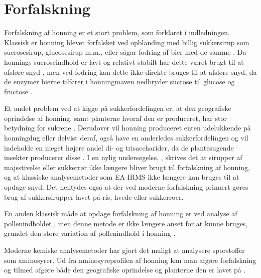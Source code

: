 \section{Forfalskning}
Forfalskning af honning er et stort problem, som forklaret i indledningen.
Klassisk er honning blevet forfalsket ved opblanding med billig sukkersirup som sucrosesirup, glucosesirup m.m., eller sågar fodring af bier med de samme \parencite{sugarhoney}.
Da honnings sucroseindhold er lavt og relativt stabilt har dette været brugt til at afsløre snyd \parencite{saccharosehoney},
men ved fodring kan dette ikke direkte bruges til at afsløre snyd, da de enzymer bierne tilfører i honningmaven nedbryder sucrose til glucose og fructose \parencite{biochemprophoney,sugarhoney}.
\par Et andet problem ved at kigge på sukkerfordelingen er, at den geografiske oprindelse af honning, samt planterne hvoraf den er produceret, har stor betydning for sukrene \parencite{geohoney}.
Derudover vil honning produceret enten udelukkende på honningdug eller delvist deraf, også have en anderledes sukkerfordelingen og vil indeholde en meget højere andel di- og trisaccharider, da de plantesugende insekter producerer disse \parencite{sugarhoney}.
\renewcommand*{\thefootnote}{\fnsymbol{footnote}}
I en nylig undersøgelse, \parencite{EUhoney}, skrives det at sirupper af majsstivelse eller sukkerrør ikke længere bliver brugt til forfalskning af honning, og at klassiske analysemetoder som EA-IRMS\footnotemark[1]{} ikke længere kan bruges til at opdage snyd.
Det hentydes også at der ved moderne forfalskning primært gøres brug af sukkersirupper lavet på ris, hvede eller sukkerroer.
\renewcommand*{\thefootnote}{\arabic{footnote}}
\par En anden klassisk måde at opdage forfalskning af honning er ved analyse af pollenindholdet \parencite{honeyindentification,pollenhoney}, men denne metode er ikke længere anset for at kunne bruges, grundet den store variation af pollenindhold i honning \parencite{authhoney}.
\par Moderne kemiske analysemetoder har gjort det muligt at analysere sporstoffer som aminosyrer.
Ud fra aminosyreprofilen af honning kan man afgøre forfalskning \parencite{adulterationhoney} og tilmed afgøre både den geografiske oprindelse og planterne den er lavet på \parencite{geohoney}.
